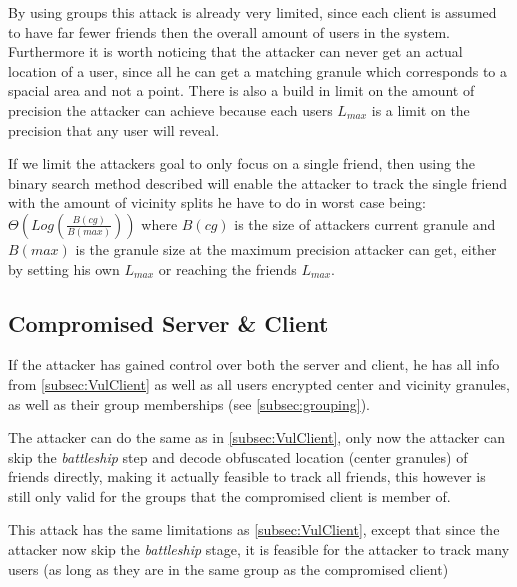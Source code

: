 By using groups this attack is already very limited, since each 
client is assumed to have far fewer friends then the overall amount
of users in the \vl system. Furthermore it is worth noticing that 
the attacker can never get an actual location of a user, since all he can get
a matching granule which corresponds to a spacial area and not a point.
There is also a build in limit on the amount of precision the attacker 
can achieve because each users $L_{max}$ is a limit on the precision that
any user will reveal. 
 
If we limit the attackers goal to only focus on a single friend, then 
using the binary search method described will enable the attacker to
track the single friend with the amount of vicinity splits he have to
do in worst case being: $\Theta(Log(\frac{B(cg)}{B(max)}))$ where $B(cg)$ is the
size of attackers current granule and $B(max)$ is the granule size at the maximum
precision attacker can get, either by setting his own $L_{max}$ or reaching the 
friends $L_{max}$.



\subsection{Compromised Server \& Client}\label{subsec:VulCliServ}
If the attacker has gained control over both the server and 
client, he has all info from \ref{subsec:VulClient} as well as 
all users encrypted center and vicinity granules, as well
as their group memberships (see \ref{subsec:grouping}).

The attacker can do the same as in \ref{subsec:VulClient}, 
only now the attacker can skip the \textit{battleship} step and decode
obfuscated location (center granules) of friends directly, making it
actually feasible to track all friends, this however is still
only valid for the groups that the compromised client is member of.

This attack has the same limitations as \ref{subsec:VulClient}, except
that since the attacker now skip the \textit{battleship} stage, it is 
feasible for the attacker to track many users (as long as they are in the
same group as the compromised client)
%
%


